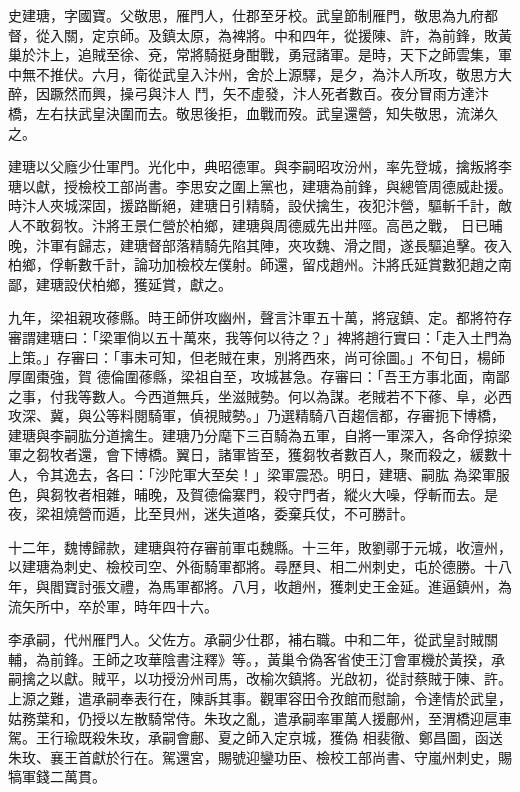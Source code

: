 \begin{pinyinscope}
 史建瑭，字國寶。父敬思，雁門人，仕郡至牙校。武皇節制雁門，敬思為九府都督，從入關，定京師。及鎮太原，為裨將。中和四年，從援陳、許，為前鋒，敗黃巢於汴上，追賊至徐、兗，常將騎挺身酣戰，勇冠諸軍。是時，天下之師雲集，軍中無不推伏。六月，衛從武皇入汴州，舍於上源驛，是夕，為汴人所攻，敬思方大醉，因蹶然而興，操弓與汴人
 鬥，矢不虛發，汴人死者數百。夜分冒雨方達汴橋，左右扶武皇決圍而去。敬思後拒，血戰而歿。武皇還營，知失敬思，流涕久之。



 建瑭以父廕少仕軍門。光化中，典昭德軍。與李嗣昭攻汾州，率先登城，擒叛將李瑭以獻，授檢校工部尚書。李思安之圍上黨也，建瑭為前鋒，與總管周德威赴援。時汴人夾城深固，援路斷絕，建瑭日引精騎，設伏擒生，夜犯汴營，驅斬千計，敵人不敢芻牧。汴將王景仁營於柏鄉，建瑭與周德威先出井陘。高邑之戰，
 日已晡晚，汴軍有歸志，建瑭督部落精騎先陷其陣，夾攻魏、滑之間，遂長驅追擊。夜入柏鄉，俘斬數千計，論功加檢校左僕射。師還，留戍趙州。汴將氏延賞數犯趙之南鄙，建瑭設伏柏鄉，獲延賞，獻之。



 九年，梁祖親攻蓚縣。時王師併攻幽州，聲言汴軍五十萬，將寇鎮、定。都將符存審謂建瑭曰：「梁軍倘以五十萬來，我等何以待之？」裨將趙行實曰：「走入土門為上策。」存審曰：「事未可知，但老賊在東，別將西來，尚可徐圖。」不旬日，楊師厚圍棗強，賀
 德倫圍蓚縣，梁祖自至，攻城甚急。存審曰：「吾王方事北面，南鄙之事，付我等數人。今西道無兵，坐滋賊勢。何以為謀。老賊若不下蓚、阜，必西攻深、冀，與公等料閱騎軍，偵視賊勢。」乃選精騎八百趨信都，存審扼下博橋，建瑭與李嗣肱分道擒生。建瑭乃分麾下三百騎為五軍，自將一軍深入，各命俘掠梁軍之芻牧者還，會下博橋。翼日，諸軍皆至，獲芻牧者數百人，聚而殺之，緩數十人，令其逸去，各曰：「沙陀軍大至矣！」梁軍震恐。明日，建瑭、嗣肱
 為梁軍服色，與芻牧者相雜，晡晚，及賀德倫寨門，殺守門者，縱火大噪，俘斬而去。是夜，梁祖燒營而遁，比至貝州，迷失道咯，委棄兵仗，不可勝計。



 十二年，魏博歸款，建瑭與符存審前軍屯魏縣。十三年，敗劉鄩于元城，收澶州，以建瑭為刺史、檢校司空、外衙騎軍都將。尋歷貝、相二州刺史，屯於德勝。十八年，與閻寶討張文禮，為馬軍都將。八月，收趙州，獲刺史王金延。進逼鎮州，為流矢所中，卒於軍，時年四十六。



 李承嗣，代州雁門人。父佐方。承嗣少仕郡，補右職。中和二年，從武皇討賊關輔，為前鋒。王師之攻華陰書注釋》等。，黃巢令偽客省使王汀會軍機於黃揆，承嗣擒之以獻。賊平，以功授汾州司馬，改榆次鎮將。光啟初，從討蔡賊于陳、許。上源之難，遣承嗣奉表行在，陳訴其事。觀軍容田令孜館而慰諭，令達情於武皇，姑務葉和，仍授以左散騎常侍。朱玫之亂，遣承嗣率軍萬人援鄜州，至渭橋迎扈車駕。王行瑜既殺朱玫，承嗣會鄜、夏之師入定京城，獲偽
 相裴徹、鄭昌圖，函送朱玫、襄王首獻於行在。駕還宮，賜號迎鑾功臣、檢校工部尚書、守嵐州刺史，賜犒軍錢二萬貫。




\end{pinyinscope}
